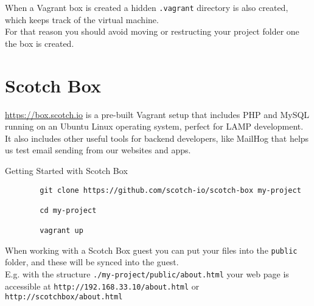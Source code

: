 When a Vagrant box is created a hidden \texttt{.vagrant} directory is also created, which keeps track of the virtual machine.
\\

For that reason you should avoid moving or restructing your project folder one the box is created.

\section{Scotch Box}

\href{Scotch Box}{https://box.scotch.io} is a pre-built Vagrant setup that includes PHP and MySQL running on an Ubuntu Linux operating system, perfect for LAMP development.
\\

It also includes other useful tools for backend developers, like MailHog that helps us test email sending from our websites and apps.

\begin{infobox}{Getting Started with Scotch Box}
    
    \begin{verbatim}
        git clone https://github.com/scotch-io/scotch-box my-project

        cd my-project

        vagrant up
    \end{verbatim}
\end{infobox}

When working with a Scotch Box guest you can put your files into the \texttt{public} folder, and these will be synced into the guest.
\\

E.g. with the structure \texttt{./my-project/public/about.html} your web page is accessible at \texttt{http://192.168.33.10/about.html} or \texttt{http://scotchbox/about.html}